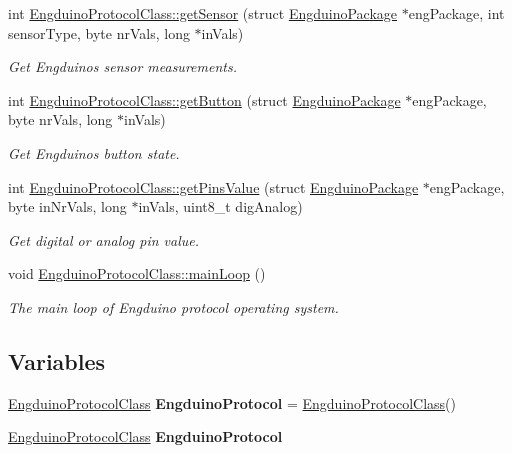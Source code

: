 \begin{DoxyCompactItemize}
int \hyperlink{group___engduino_protocol_ga504071d488f9d2a9ace156c4523ea18d}{Engduino\+Protocol\+Class\+::get\+Sensor} (struct \hyperlink{struct_engduino_package}{Engduino\+Package} $\ast$eng\+Package, int sensor\+Type, byte nr\+Vals, long $\ast$in\+Vals)
\begin{DoxyCompactList}\small\item\em Get Engduino\textquotesingle{}s sensor measurements. \end{DoxyCompactList}\item 
int \hyperlink{group___engduino_protocol_gad53e6d5d3c390c3eca7f0456aa7a5d05}{Engduino\+Protocol\+Class\+::get\+Button} (struct \hyperlink{struct_engduino_package}{Engduino\+Package} $\ast$eng\+Package, byte nr\+Vals, long $\ast$in\+Vals)
\begin{DoxyCompactList}\small\item\em Get Engduino\textquotesingle{}s button state. \end{DoxyCompactList}\item 
int \hyperlink{group___engduino_protocol_ga6945fb3a4a3bb9b86e602168e21628b7}{Engduino\+Protocol\+Class\+::get\+Pins\+Value} (struct \hyperlink{struct_engduino_package}{Engduino\+Package} $\ast$eng\+Package, byte in\+Nr\+Vals, long $\ast$in\+Vals, uint8\+\_\+t dig\+Analog)
\begin{DoxyCompactList}\small\item\em Get digital or analog pin value. \end{DoxyCompactList}\item 
void \hyperlink{group___engduino_protocol_ga69274ee75df14c92966878a83248f89e}{Engduino\+Protocol\+Class\+::main\+Loop} ()
\begin{DoxyCompactList}\small\item\em The main loop of Engduino protocol operating system. \end{DoxyCompactList}\end{DoxyCompactItemize}
\subsection*{Variables}
\begin{DoxyCompactItemize}
\item 
\hypertarget{group___engduino_protocol_gaa4480082d514dbc7b702a2def3361ad2}{}\hyperlink{class_engduino_protocol_class}{Engduino\+Protocol\+Class} {\bfseries Engduino\+Protocol} = \hyperlink{class_engduino_protocol_class}{Engduino\+Protocol\+Class}()\label{group___engduino_protocol_gaa4480082d514dbc7b702a2def3361ad2}

\item 
\hypertarget{group___engduino_protocol_gaa4480082d514dbc7b702a2def3361ad2}{}\hyperlink{class_engduino_protocol_class}{Engduino\+Protocol\+Class} {\bfseries Engduino\+Protocol}\label{group___engduino_protocol_gaa4480082d514dbc7b702a2def3361ad2}

\end{DoxyCompactItemize}



